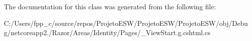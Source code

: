 The documentation for this class was generated from the following file\+:\begin{DoxyCompactItemize}
\item 
C\+:/\+Users/fpp\+\_\+c/source/repos/\+Projeto\+E\+S\+W/\+Projeto\+E\+S\+W/\+Projeto\+E\+S\+W/obj/\+Debug/netcoreapp2./\+Razor/\+Areas/\+Identity/\+Pages/\+\_\+\+View\+Start.\+g.\+cshtml.\+cs\end{DoxyCompactItemize}
